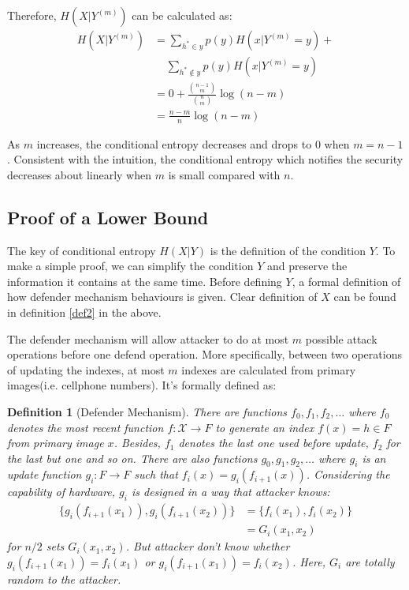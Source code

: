 \documentclass[10pt, conference, compsocconf]{IEEEtran}
\newtheorem{mydef}{Definition}
\begin{document}
        Therefore, $H(X | Y^{(m)})$ can be calculated as:
        \begin{align*}
            H(X | Y^{(m)}) %
                &= \sum_{h^* \in y} p(y) H(x | Y^{(m)} = y) + \\
                    & \;\;\;\; \sum_{h^* \notin y} p(y) H(x | Y^{(m)} = y)\\
                &= 0+\frac{\binom{n-1}{m}}{\binom{n}{m}} \log(n-m)\\
                &= \frac{n-m}{n} \log(n-m)
        \end{align*}

        As $m$ increases,
        the conditional entropy decreases and drops to $0$ when $m = n-1$.
        Consistent with the intuition, the conditional
        entropy which notifies the security decreases about linearly when $m$ is small
        compared with $n$.

    \subsection{Proof of a Lower Bound}
        The key
        of conditional entropy $H(X|Y)$ is the definition of the condition $Y$.
        To make a simple proof, we can simplify the
        condition $Y$ and preserve the information it contains
        at the same time. Before defining $Y$, a
        formal definition of how defender mechanism behaviours is given. Clear
        definition of $X$ can be found in definition \ref{def2} in the above.

        The defender mechanism will allow attacker to do at most $m$ possible
        attack operations before one defend operation. More specifically, between
        two operations of updating the indexes,
        at most $m$ indexes are calculated from primary images(i.e. cellphone numbers).
        It's formally defined as:
        \begin{mydef}[Defender Mechanism]
            There are functions $f_0, f_1, f_2, \ldots$ where
            $f_0$ denotes the most recent function $f: \mathcal{X} \rightarrow F$
            to generate an index $f(x) = h \in F$ from primary image $x$.
            Besides, $f_1$ denotes the last one used before update, $f_2$ for the last but one and so on.
            There are also functions $g_0, g_1, g_2, \ldots$ where
            $g_i$ is an update function $g_i: F \rightarrow F$ such that
            $f_i(x) = g_i(f_{i+1}(x))$. Considering the capability of hardware,
            $g_i$ is designed in a way that attacker knows:
            \begin{align*}
                \{g_i(f_{i+1}(x_1)), g_i(f_{i+1}(x_2))\} &= \{ f_i(x_1), f_i(x_2)\}\\
                     &= G_i(x_1, x_2)
            \end{align*}
            for $n/2$ sets $G_i(x_1, x_2)$.
            But attacker don't know whether $g_i(f_{i+1}(x_1)) = f_i(x_1)$ or
            $g_i(f_{i+1}(x_1)) = f_i(x_2)$.
            Here, $G_i$ are totally random
            to the attacker.
        \end{mydef}
\end{document}
